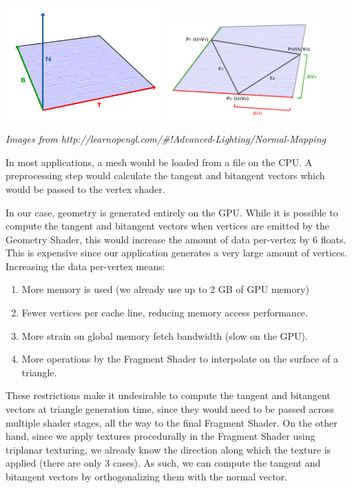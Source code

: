 \documentclass {article}
\begin{document}
\begin{center}
    \includegraphics[width=6cm]{tbn1.png}
    \includegraphics[width=6cm]{tbn2.png}

    \textit{Images from http://learnopengl.com/\#!Advanced-Lighting/Normal-Mapping}
\end{center}

In most applications, a mesh would be loaded from a file on the CPU. A preprocessing step would calculate the tangent and bitangent vectors which would be passed to the vertex shader.

In our case, geometry is generated entirely on the GPU. While it is possible to compute the tangent and bitangent vectors when vertices are emitted by the Geometry Shader, this would increase the amount of data per-vertex by 6 floats. This is expensive since our application generates a very large amount of vertices. Increasing the data per-vertex means:

\begin{enumerate}
\item More memory is used (we already use up to 2 GB of GPU memory)
\item Fewer vertices per cache line, reducing memory access performance.
\item More strain on global memory fetch bandwidth (slow on the GPU).
\item More operations by the Fragment Shader to interpolate on the surface of a triangle.
\end{enumerate}

These restrictions make it undesirable to compute the tangent and bitangent vectors at triangle generation time, since they would need to be passed across multiple shader stages, all the way to the final Fragment Shader. On the other hand, since we apply textures procedurally in the Fragment Shader using triplanar texturing, we already know the direction along which the texture is applied (there are only 3 cases). As such, we can compute the tangent and bitangent vectors by orthogonalizing them with the normal vector.
\end{document}
